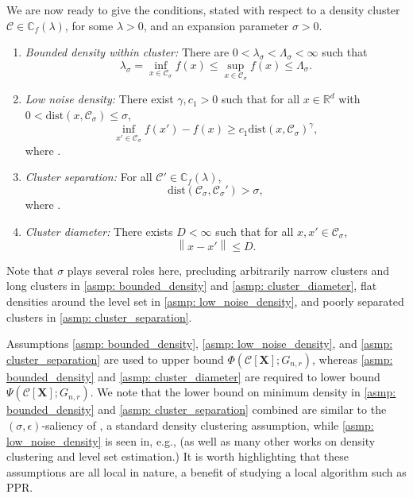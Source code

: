 \documentclass{article}
\newcommand{\diam}{\mathrm{diam}}
\newcommand{\set}[1]{\left\{#1\right\}}
\newcommand{\Reals}{\mathbb{R}}
\newcommand{\Rd}{\Reals^d}
\newcommand{\norm}[1]{\left\lVert#1\right\rVert}
\newcommand{\1}{\mathbf{1}}
\newcommand{\dist}{\mathrm{dist}}
\newcommand{\Xbf}{\mathbf{X}}
\newcommand{\Cbb}{\mathbb{C}}
\newcommand{\Cset}{\mathcal{C}}
\newcommand{\Aset}{\mathcal{A}}
\newcommand{\Asig}{\Aset_{\sigma}}
\newcommand{\Csig}{\Cset_{\sigma}}
\theoremstyle{aldenthm}
\theoremstyle{aldenrmrk}
\begin{document}
We are now ready to give the conditions, stated with respect to a density
cluster $\Cset \in \Cbb_f(\lambda)$, for some $\lambda > 0$, and an expansion 
parameter $\sigma > 0$. 

\begin{enumerate}[label=(A\arabic*)]
\item
\label{asmp: bounded_density}
\emph{Bounded density within cluster:} There are $0 < \lambda_{\sigma} <
\Lambda_{\sigma} < \infty$ such that
$$
\lambda_{\sigma} = \inf_{x \in \Csig} f(x) \leq \sup_{x \in \Csig} f(x) \leq
\Lambda_{\sigma}.
$$
	
\item 
\label{asmp: low_noise_density}
\emph{Low noise density:} There exist $\gamma, c_1 > 0$ such that for all $x
\in \Rd$ with $0 < \dist(x, \Csig) \leq \sigma$,   
$$
  \inf_{x' \in \Csig} f(x') - f(x) \geq c_1 \dist(x, \Csig)^{\gamma},
$$
where \smash{$\dist(x,\Aset) = \inf_{x_0 \in \Aset} \norm{x - x_0}$}.

\item
\label{asmp: cluster_separation}
\emph{Cluster separation:}
For all $\Cset' \in \Cbb_f(\lambda)$,
$$
\dist(\Csig,\Csig') > \sigma,
$$
where \smash{$\dist(\Aset,\Aset') = \inf_{x \in \Aset} \dist(x,\Aset')$}.  
	
\item
\label{asmp: cluster_diameter}
\emph{Cluster diameter:}
There exists $D < \infty$ such that for all $x, x' \in \Csig$,
$$
\norm{x - x'} \leq D.
$$
\end{enumerate}

Note that $\sigma$ plays several roles here, precluding arbitrarily narrow
clusters and long clusters in \ref{asmp: bounded_density} and \ref{asmp:
  cluster_diameter}, flat densities around the level set in \ref{asmp: 
  low_noise_density}, and poorly separated clusters in \ref{asmp:
  cluster_separation}. 

Assumptions \ref{asmp: bounded_density}, \ref{asmp: low_noise_density}, and
\ref{asmp: cluster_separation} are used to upper bound $\Phi(\Cset[\Xbf];
G_{n,r})$, whereas \ref{asmp: bounded_density} and \ref{asmp: cluster_diameter} 
are required to lower bound $\Psi(\Cset[\Xbf]; G_{n,r})$. We note that the
lower bound on minimum density in \ref{asmp: bounded_density} and \ref{asmp:  
cluster_separation} combined are similar to the $(\sigma,\epsilon)$-saliency of
\citet{chaudhuri2010}, a standard density clustering assumption, while
\ref{asmp: low_noise_density} is seen in, e.g., \citet{singh2009} (as well as
many other works on density clustering and level set estimation.) It is worth
highlighting that these assumptions are all local in nature, a benefit of
studying a local algorithm such as PPR.
\end{document}
